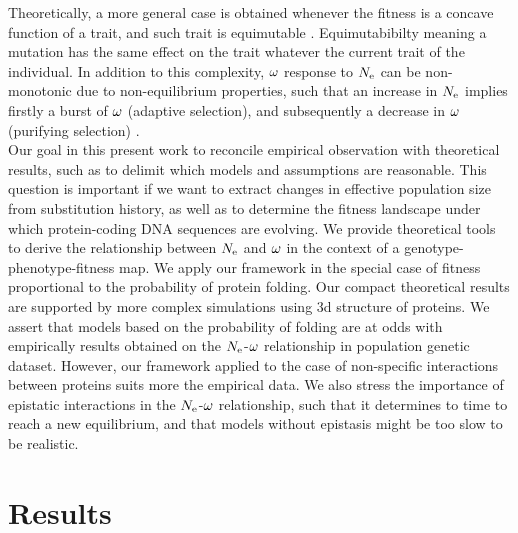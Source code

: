 \documentclass{article}
\begin{document}
Theoretically, a more general case is obtained whenever the fitness is a concave function of a trait, and such trait is equimutable \cite{Cherry1998}.
Equimutabibilty meaning a mutation has the same effect on the trait whatever the current trait of the individual.
In addition to this complexity, $\omega$ response to $N_{\mathrm{e}}$ can be non-monotonic due to non-equilibrium properties, such that an increase in $N_{\mathrm{e}}$ implies firstly a burst of $\omega$ (adaptive selection), and subsequently a decrease in $\omega$ (purifying selection) \cite{Jones2016}.\\
Our goal in this present work to reconcile empirical observation with theoretical results, such as to delimit which models and assumptions are reasonable.
This question is important if we want to extract changes in effective population size from substitution history, as well as to determine the fitness landscape under which protein-coding DNA sequences are evolving.
We provide theoretical tools to derive the relationship between $N_{\mathrm{e}}$ and $\omega$ in the context of a genotype-phenotype-fitness map.
We apply our framework in the special case of fitness proportional to the probability of protein folding.
Our compact theoretical results are supported by more complex simulations using 3d structure of proteins.
We assert that models based on the probability of folding are at odds with empirically results obtained on the $N_{\mathrm{e}}$-$\omega$ relationship in population genetic dataset.
However, our framework applied to the case of non-specific interactions between proteins suits more the empirical data.
We also stress the importance of epistatic interactions in the $N_{\mathrm{e}}$-$\omega$ relationship, such that it determines to time to reach a new equilibrium, and that models without epistasis might be too slow to be realistic.
\section*{Results}
\end{document}

